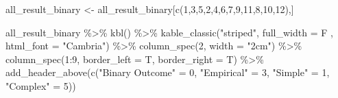 \documentclass[
]{article}
\newenvironment{Shaded}{\begin{snugshade}}{\end{snugshade}}
\newcommand{\AttributeTok}[1]{\textcolor[rgb]{0.77,0.63,0.00}{#1}}
\newcommand{\DecValTok}[1]{\textcolor[rgb]{0.00,0.00,0.81}{#1}}
\newcommand{\FunctionTok}[1]{\textcolor[rgb]{0.00,0.00,0.00}{#1}}
\newcommand{\NormalTok}[1]{#1}
\newcommand{\OtherTok}[1]{\textcolor[rgb]{0.56,0.35,0.01}{#1}}
\newcommand{\SpecialCharTok}[1]{\textcolor[rgb]{0.00,0.00,0.00}{#1}}
\newcommand{\StringTok}[1]{\textcolor[rgb]{0.31,0.60,0.02}{#1}}
\begin{document}
\begin{Shaded}
\begin{Highlighting}[]
\NormalTok{all\_result\_binary }\OtherTok{\textless{}{-}}\NormalTok{ all\_result\_binary[}\FunctionTok{c}\NormalTok{(}\DecValTok{1}\NormalTok{,}\DecValTok{3}\NormalTok{,}\DecValTok{5}\NormalTok{,}\DecValTok{2}\NormalTok{,}\DecValTok{4}\NormalTok{,}\DecValTok{6}\NormalTok{,}\DecValTok{7}\NormalTok{,}\DecValTok{9}\NormalTok{,}\DecValTok{11}\NormalTok{,}\DecValTok{8}\NormalTok{,}\DecValTok{10}\NormalTok{,}\DecValTok{12}\NormalTok{),]}
\end{Highlighting}
\end{Shaded}

\begin{Shaded}
\begin{Highlighting}[]
\NormalTok{all\_result\_binary }\SpecialCharTok{\%\textgreater{}\%}
  \FunctionTok{kbl}\NormalTok{() }\SpecialCharTok{\%\textgreater{}\%}
  \FunctionTok{kable\_classic}\NormalTok{(}\StringTok{"striped"}\NormalTok{, }\AttributeTok{full\_width =}\NormalTok{ F , }\AttributeTok{html\_font =} \StringTok{"Cambria"}\NormalTok{) }\SpecialCharTok{\%\textgreater{}\%}
  \FunctionTok{column\_spec}\NormalTok{(}\DecValTok{2}\NormalTok{, }\AttributeTok{width =} \StringTok{"2cm"}\NormalTok{)  }\SpecialCharTok{\%\textgreater{}\%}
  \FunctionTok{column\_spec}\NormalTok{(}\DecValTok{1}\SpecialCharTok{:}\DecValTok{9}\NormalTok{, }\AttributeTok{border\_left =}\NormalTok{ T, }\AttributeTok{border\_right =}\NormalTok{ T) }\SpecialCharTok{\%\textgreater{}\%}
  \FunctionTok{add\_header\_above}\NormalTok{(}\FunctionTok{c}\NormalTok{(}\StringTok{"Binary Outcome"} \OtherTok{=} \DecValTok{0}\NormalTok{, }\StringTok{"Empirical"} \OtherTok{=} \DecValTok{3}\NormalTok{, }\StringTok{"Simple"} \OtherTok{=} \DecValTok{1}\NormalTok{, }\StringTok{"Complex"} \OtherTok{=} \DecValTok{5}\NormalTok{))}
\end{Highlighting}
\end{Shaded}
\end{document}
